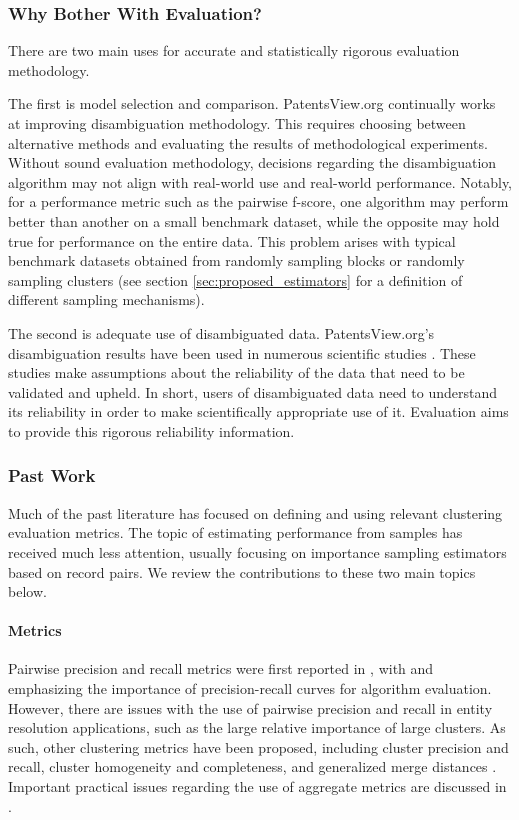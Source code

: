 \documentclass[fontsize=11pt]{article}
\theoremstyle{definition}
\begin{document}
\subsubsection{Why Bother With Evaluation?}

There are two main uses for accurate and statistically rigorous evaluation methodology.

The first is model selection and comparison. PatentsView.org continually works at improving disambiguation methodology. This requires choosing between alternative methods and evaluating the results of methodological experiments. Without sound evaluation methodology, decisions regarding the disambiguation algorithm may not align with real-world use and real-world performance. Notably, for a performance metric such as the pairwise f-score, one algorithm may perform better than another on a small benchmark dataset, while the opposite may hold true for performance on the entire data. This problem arises with typical benchmark datasets obtained from randomly sampling blocks or randomly sampling clusters (see section \ref{sec:proposed_estimators} for a definition of different sampling mechanisms).

The second is adequate use of disambiguated data. PatentsView.org's disambiguation results have been used in numerous scientific studies \citep{toole2021patentsview}. These studies make assumptions about the reliability of the data that need to be validated and upheld. In short, users of disambiguated data need to understand its reliability in order to make scientifically appropriate use of it. Evaluation aims to provide this rigorous reliability information.

\subsubsection{Past Work}

Much of the past literature has focused on defining and using relevant clustering evaluation metrics. The topic of estimating performance from samples has received much less attention, usually focusing on importance sampling estimators based on record pairs. We review the contributions to these two main topics below.

\paragraph{Metrics}

Pairwise precision and recall metrics were first reported in \cite{Newcombe1959}, with \cite{Bilenko2003} and \cite{Christen2007} emphasizing the importance of precision-recall curves for algorithm evaluation. However, there are issues with the use of pairwise precision and recall in entity resolution applications, such as the large relative importance of large clusters. As such, other clustering metrics have been proposed, including cluster precision and recall, cluster homogeneity and completeness, and generalized merge distances \citep{Michelson2009, Menestrina2010, Maidasani2012, Barnes2015}. Important practical issues regarding the use of aggregate metrics are discussed in \cite{Hand2018}.
\end{document}

